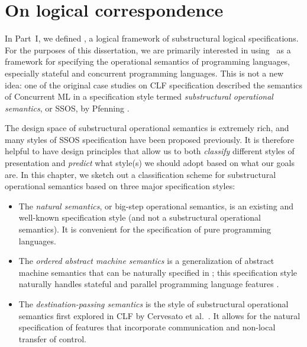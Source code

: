 \chapter{On logical correspondence}
\label{chapter-correspondence}

In Part~I, we defined \sls, a logical framework of substructural
logical specifications. For the purposes of this dissertation, we are
primarily interested in using \sls~as a framework for specifying the
operational semantics of programming languages, especially stateful
and concurrent programming languages. This is not a new idea: one of
the original case studies on CLF specification described the semantics
of Concurrent ML \cite{cervesato02concurrent} in a specification style
termed {\it substructural operational semantics}, or SSOS, by Pfenning
\cite{pfenning04substructural}. 

The design space of substructural operational semantics is extremely
rich, and many styles of SSOS specification have been proposed
previously. It is therefore helpful to have design principles that
allow us to both {\it classify} different styles of presentation and
{\it predict} what style(s) we should adopt based on what our goals
are. In this chapter, we sketch out a classification scheme for
substructural operational semantics based on three major specification
styles:

\begin{itemize}
\item The {\it natural semantics}, or big-step operational semantics,
  is an existing and well-known specification style (and not a
  substructural operational semantics). It is convenient for the
  specification of pure programming languages.

\item The {\it ordered abstract machine semantics} is a generalization
  of abstract machine semantics that can be naturally specified in
  \sls; this specification style naturally handles stateful and
  parallel programming language features
  \cite{pfenning09substructural}.

\item The {\it destination-passing semantics} is the style of
  substructural operational semantics first explored in CLF by
  Cervesato et al.~\cite{cervesato02concurrent}. It allows for the
  natural specification of features that incorporate 
  communication and non-local transfer of control. %
\end{itemize}



